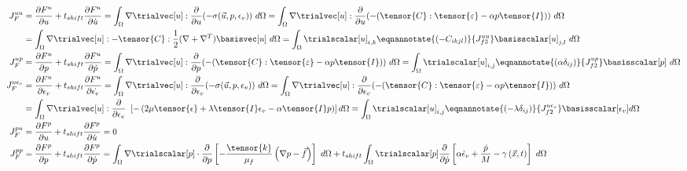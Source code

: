 \begin{align}
%
J_F^{uu} &= \frac{\partial F^u}{\partial u} + t_{shift} \frac{\partial F^u}{\partial \dot{u}} = \int_{\Omega} \nabla \trialvec[u] : \frac{\partial}{\partial u} (- \sigma(\vec{u},p,\epsilon_{v})) \
d\Omega = \int_{\Omega} \nabla \trialvec[u] : \frac{\partial}{\partial u} (-(\tensor{C}:\tensor{\varepsilon} -\alpha p \tensor{I})) \ d\Omega \\
&= \int_{\Omega} \nabla \trialvec[u] : -\tensor{C}: \frac{1}{2} (\nabla + \nabla^T) \basisvec[u] \ d\Omega = \int_{\Omega} \trialscalar[u]_{i,k}
\eqnannotate{\left(-C_{ikjl}\right)}{J_{f3}^{uu}} \basisscalar[u]_{j,l} \ d\Omega \\
%
J_F^{up} &= \frac{\partial F^u}{\partial p} + t_{shift} \frac{\partial F^u}{\partial \dot{p}} = \int_{\Omega} \nabla \trialvec[u] : \frac{\partial}{\partial p}(-(\tensor{C}:\tensor{\varepsilon} -\alpha p \tensor{I})) \ d\Omega =
\int_{\Omega} \trialscalar[u]_{i,j} \eqnannotate{\left(\alpha \delta_{ij}\right)}{J_{f2}^{up}} \basisscalar[p] \ d\Omega \\
%
J_F^{u \epsilon_{v}} &= \frac{\partial F^u}{\partial \epsilon_{v}} + t_{shift} \frac{\partial F^u}{\partial \dot{\epsilon_{v}}} = \int_{\Omega} \nabla \trialvec[u] : \frac{\partial}{\partial \epsilon_{v}}
(-\sigma(\vec{u},p,\epsilon_{v})) \ d\Omega = \int_{\Omega} \nabla \trialvec[u] :
\frac{\partial}{\partial \epsilon_{v}} (-(\tensor{C}:\tensor{\varepsilon} -\alpha p \tensor{I})) \ d\Omega \\
&= \int_{\Omega} \nabla \trialvec[u] : \frac{\partial}{\partial \epsilon_{v}} \
\left[-\left(2 \mu \tensor{\epsilon} + \lambda \tensor{I} \epsilon_{v} - \alpha \tensor{I} p \right) \right] d\Omega =
\int_{\Omega} \trialscalar[u]_{i,j} \eqnannotate{\left(-\lambda \delta_{ij} \right)}{J_{f2}^{u \epsilon_{v}}} \basisscalar[\epsilon_{v}] d\Omega  \\
%
%
J_F^{pu} &= \frac{\partial F^p}{\partial u} + t_{shift} \frac{\partial F^p}{\partial \dot{u}} = 0 \\
%
J_F^{pp} &= \frac{\partial F^p}{\partial p} + t_{shift} \frac{\partial F^p}{\partial \dot{p}} =
\int_{\Omega} \nabla \trialscalar[p] \cdot \frac{\partial}{\partial p} \left[-\frac{\tensor{k}}{\mu_{f}} \left(\nabla p - \vec{f} \right) \right] \ d\Omega  +
t_{shift}\int_{\Omega} \trialscalar[p] \frac{\partial}{\partial \dot{p}} \left[\alpha\dot{\epsilon}_{v} + \frac{\dot{p}}{M} - \gamma\left(\vec{x},t\right)\right] \ d\Omega \\

\end{align}
